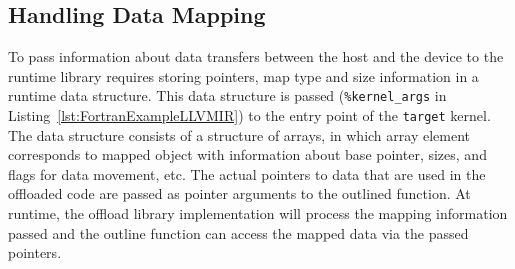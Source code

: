 \documentclass[acmtog,natbib=false]{acmart}
\newcommand{\code}[1]{\texttt{#1}\xspace}
\begin{document}


\subsection{Handling Data Mapping}
\label{sec:HandlingDataMapping}


To pass information about data transfers between the host and the device to the runtime library requires storing pointers, map type and size information in a runtime data structure. 
This data structure is passed (\code{\%kernel\_args} in Listing~\ref{lst:FortranExampleLLVMIR}) to the entry point of the \code{target} kernel.
The data structure consists of a structure of arrays, in which array element corresponds to mapped object with information about base pointer, sizes, and flags for data movement, etc.
The actual pointers to data that are used in the offloaded code are passed as pointer arguments to the outlined function.
At runtime, the offload library implementation will process the mapping information passed and the outline function can access the mapped data via the passed pointers.

\end{document}
